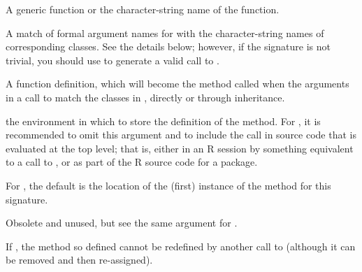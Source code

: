 %
\begin{Arguments}
\begin{ldescription}
\item[\code{f}]  A generic function or the character-string name of the function. 
\item[\code{signature}]  A match of formal argument names for  with
the character-string names of corresponding classes.  See the
details below; however, if the signature is not trivial, you should use  to generate a valid call to .
\item[\code{definition}]  A function definition, which will become the method
called when the arguments in a call to  match the
classes in , directly or through inheritance. 
\item[\code{where}] the environment in which to store the definition of the
method.
For , it is recommended to omit this argument and to include the call in source code that is evaluated at the top level; that is, either in an R session by something equivalent to a call to , or as part of the R source code for a package.

For , the default is the location of the (first)
instance of the method for this signature.
\item[\code{valueClass}]  Obsolete and unused, but see the same argument for . 
\item[\code{sealed}]  If , the method so defined cannot be
redefined by another call to  (although it can
be removed and then re-assigned).
\end{ldescription}
\end{Arguments}
%

